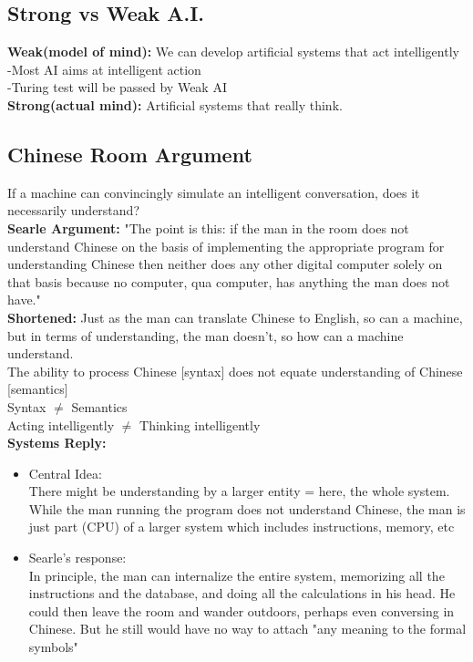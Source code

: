 \documentclass{article}
\begin{document}
\subsection{Strong vs Weak A.I.}
\textbf{Weak(model of mind):} We can develop artificial systems that act intelligently \\
\indent -Most AI aims at intelligent action \\
\indent -Turing test will be passed by Weak AI \\
\noindent \textbf{Strong(actual mind):} Artificial systems that really think. \\

\subsection{Chinese Room Argument}
If a machine can convincingly simulate an intelligent conversation, does it necessarily understand? \\
\textbf{Searle Argument:} "The point is this: if the man in the room does not understand Chinese on the basis of implementing the appropriate program for understanding Chinese then neither does any other digital computer solely on that basis because no computer, qua computer, has anything the man does not have." \\
\textbf{Shortened:} Just as the man can translate Chinese to English, so can a machine, but in terms of understanding, the man doesn't, so how can a machine understand. \\
The ability to process Chinese [syntax] does not equate understanding of Chinese [semantics] \\
Syntax $\neq$ Semantics \\
Acting intelligently $\neq$ Thinking intelligently \\

\noindent\textbf{Systems Reply: } 
\begin{itemize}
    \item Central Idea: \\
There might be understanding by a larger entity = here, the whole system. While the man running the program does not understand Chinese, the man is just part (CPU) of a larger system which includes instructions, memory, etc 
    \item 
Searle's response: \\
In principle, the man can internalize the entire system, memorizing all the instructions and the database, and doing all the calculations in his head. He could then leave the room and wander outdoors, perhaps even conversing in Chinese. But he still would have no way to attach "any meaning to the formal symbols"
\end{itemize}
\end{document}
